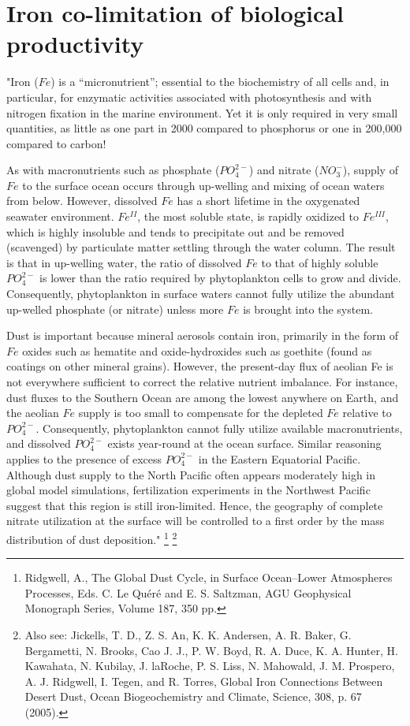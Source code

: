 \newpage

\section{Iron co-limitation of biological productivity}

"Iron (\(Fe\)) is a “micronutrient”; essential to the biochemistry of all cells and, in particular, for enzymatic activities associated with photosynthesis and with nitrogen fixation in the marine environment. Yet it is only required in very small quantities, as little as one part in 2000 compared to phosphorus
or one in 200,000 compared to carbon! 

As with macronutrients such as phosphate (\(PO^{2-}_{4}\)) and nitrate (\(NO^{-}_{3}\)), supply of \(Fe\) to the surface ocean occurs through up-welling and mixing of ocean waters from below. However, dissolved \(Fe\) has a short lifetime in the oxygenated seawater environment. \(Fe^{II}\), the most soluble state, is rapidly oxidized to \(Fe^{III}\), which is highly insoluble and tends to precipitate out and be removed (scavenged) by particulate matter settling through the water column. The result is that in up-welling water, the ratio of dissolved \(Fe\) to that of highly soluble \(PO^{2-}_{4}\) is lower than the ratio required by phytoplankton cells to grow and divide. Consequently, phytoplankton in surface waters cannot fully utilize the abundant up-welled
phosphate (or nitrate) unless more \(Fe\) is brought into the system.

Dust is important because mineral aerosols contain iron, primarily in the form of \(Fe\) oxides such as hematite and oxide-hydroxides such as goethite (found as coatings on other mineral grains). However, the present-day flux of aeolian Fe is not everywhere sufficient to correct the relative nutrient imbalance. For instance, dust fluxes to the Southern Ocean are among the lowest anywhere on Earth, and the aeolian \(Fe\) supply is too small to compensate for the depleted \(Fe\) relative to \(PO^{2-}_{4}\). Consequently, phytoplankton cannot fully utilize available macronutrients, and dissolved \(PO^{2-}_{4}\) exists year-round at the ocean surface. Similar reasoning applies to the presence of excess \(PO^{2-}_{4}\) in the Eastern Equatorial Pacific. Although dust supply to the North Pacific often appears moderately high in global model simulations, fertilization experiments in the Northwest Pacific suggest that this region is still iron-limited. Hence, the geography of complete nitrate utilization at the surface will be controlled to a first order by the mass distribution of dust deposition." \footnote{Ridgwell, A., The Global Dust Cycle, in Surface Ocean--Lower Atmospheres Processes, Eds. C. Le Quéré and E. S. Saltzman, AGU Geophysical Monograph Series, Volume 187, 350 pp.} \footnote{Also see: Jickells, T. D., Z. S. An, K. K. Andersen, A. R. Baker, G. Bergametti, N. Brooks, Cao J. J., P. W. Boyd, R. A. Duce, K. A. Hunter, H. Kawahata, N. Kubilay, J. laRoche, P. S. Liss, N. Mahowald, J. M. Prospero, A. J. Ridgwell, I. Tegen, and R. Torres, Global Iron Connections Between Desert Dust, Ocean Biogeochemistry and Climate, Science, 308, p. 67 (2005).}

